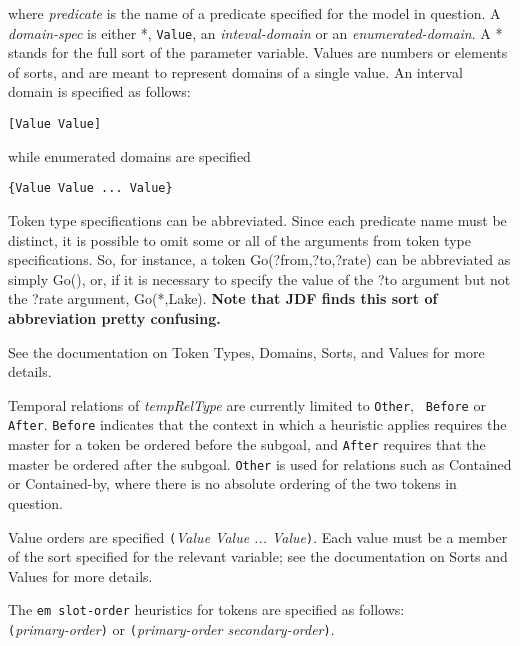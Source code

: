 where {\em predicate} is the name of a predicate specified for the
model in question. A {\em domain-spec} is either *, {\tt Value}, an
{\em inteval-domain} or an {\em enumerated-domain}.  A * stands for
the full sort of the parameter variable.  Values are numbers or
elements of sorts, and are meant to represent domains of a single
value.  An interval domain is specified as follows:

{\tt [Value Value]}

while enumerated domains are specified    

{\tt \{Value Value ... Value\}}

Token type specifications can be abbreviated.  Since each predicate name
must be distinct, it is possible to omit some or all of the arguments
from token type specifications.  So, for instance, a token
Go(?from,?to,?rate) can be abbreviated as simply Go(), or, if it is necessary
to specify the value of the ?to argument but not the ?rate argument,
Go(*,Lake).  {\bf Note that JDF finds this sort of abbreviation pretty
confusing.}

See the documentation on Token Types, Domains, Sorts, and Values for more details.


Temporal relations of {\em tempRelType} are currently limited to {\tt Other}, {\tt
Before} or {\tt After}.  {\tt Before} indicates that the context in which a 
heuristic applies requires the master for a token be ordered before
the subgoal, and {\tt After} requires that the master be ordered
after the subgoal.  {\tt Other} is used for relations such as Contained
or Contained-by, where there is no absolute ordering of the two tokens
in question.

Value orders are specified {\tt (}{\em Value Value ... Value}{\tt)}.
Each value must be a member of the sort specified for the relevant
variable; see the documentation on Sorts and Values for more details.


The {\tt em slot-order} heuristics for tokens are specified as
follows:\\ {\tt(}{\em primary-order}{\tt)} or {\tt(}{\em primary-order 
secondary-order}{\tt)}.

